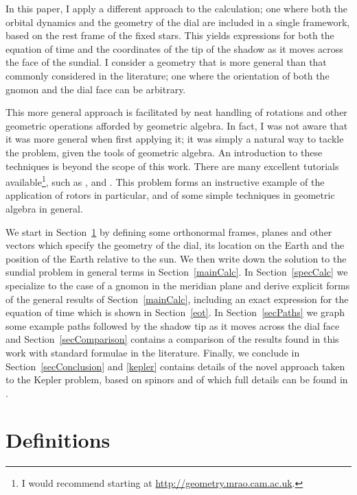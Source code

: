 \documentclass[12pt]{article}
\begin{document}
In this paper, I apply a different approach to the calculation; one where both the orbital dynamics and the geometry of the dial are included in a single framework, based on the rest frame of the fixed stars. This yields expressions for both the equation of time and the coordinates of the tip of the shadow as it moves across the face of the sundial. I consider a geometry that is more general than that commonly considered in the literature; one where the orientation of both the gnomon and the dial face can be arbitrary.

This more general approach is facilitated by neat handling of rotations and other geometric operations afforded by geometric algebra. In fact, I was not aware that it was more general when first applying it; it was simply a natural way to tackle the problem, given the tools of geometric algebra. An introduction to these techniques is beyond the scope of this work. There are many excellent tutorials available\footnote{I would recommend starting at \href{http://geometry.mrao.cam.ac.uk/home/introduction-to-ga/}{http://geometry.mrao.cam.ac.uk}.}, such as \cite{inanr}, \cite{umlfpae} and \cite{GAbook}. This problem forms an instructive example of the application of rotors in particular, and of some simple techniques in geometric algebra in general.

We start in Section~\ref{secDefinitions} by defining some orthonormal frames, planes and other vectors which specify the geometry of the dial, its location on the Earth and the position of the Earth relative to the sun. We then write down the solution to the sundial problem in general terms in Section~\ref{mainCalc}. In Section~\ref{specCalc} we specialize to the case of a gnomon in the meridian plane and derive explicit forms of the general results of Section~\ref{mainCalc}, including an exact expression for the equation of time which is shown in Section~\ref{eot}. In Section~\ref{secPaths} we graph some example paths followed by the shadow tip as it moves across the dial face and Section~\ref{secComparison} contains a comparison of the results found in this work with standard formulae in the literature. Finally, we conclude in Section~\ref{secConclusion} and \ref{kepler} contains details of the novel approach taken to the Kepler problem, based on spinors and of which full details can be found in \cite{GAbook}.
%
\section{Definitions} \label{secDefinitions}
%
\end{document}
